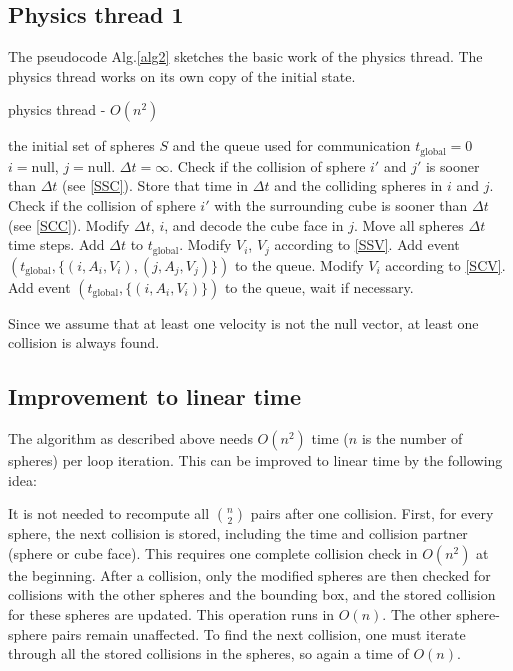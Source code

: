 \documentclass[journal, letterpaper]{IEEEtran}
\begin{document}
\subsection{Physics thread 1}
The pseudocode Alg.\ref{alg2} sketches the basic work of the physics thread. The physics thread works on its own copy of the initial state.
\begin{algorithm}
\caption{physics thread - $O(n^2)$}
\label{alg2}
\begin{algorithmic}
	\REQUIRE the initial set of spheres $S$ and the queue used for communication
	\STATE $t_\text{global}=0$ 
	\LOOP
		\STATE $i=\text{null}$, $j=\text{null}$.
		\STATE $\Delta t = \infty$.
			\STATE Check if the collision of sphere $i'$ and $j'$ is sooner than $\Delta t$ (see \ref{SSC}). Store that time in $\Delta t$ and the colliding spheres in $i$ and $j$.
		\ENDFOR
		\STATE Check if the collision of sphere $i'$ with the surrounding cube is sooner than $\Delta t$ (see \ref{SCC}). Modify $\Delta t$, $i$, and decode the cube face in $j$.
		\ENDFOR
		\STATE Move all spheres $\Delta t$ time steps.
		\STATE Add $\Delta t$ to $t_\text{global}$.
			\STATE Modify $V_i$, $V_j$ according to \ref{SSV}.
			\STATE Add event $(t_\text{global}, \{(i, A_i, V_i), (j, A_j, V_j)\})$ to the queue.
			\STATE Modify $V_i$ according to \ref{SCV}.
			\STATE Add event $(t_\text{global}, \{(i, A_i, V_i)\})$ to the queue, wait if necessary.
		\ENDIF
	\ENDLOOP
\end{algorithmic}
\end{algorithm}
Since we assume that at least one velocity is not the null vector, at least one collision is always found.

\subsection{Improvement to linear time}
The algorithm as described above needs $O(n^2)$ time ($n$ is the number of spheres) per loop iteration.
This can be improved to linear time by the following idea:

It is not needed to recompute all $\binom{n}{2}$ pairs after one collision. First, for every sphere, the next collision is stored, including the time and collision partner (sphere or cube face). This requires one complete collision check in $O(n^2)$ at the beginning. After a collision, only the modified spheres are then checked for collisions with the other spheres and the bounding box, and the stored collision for these spheres are updated. This operation runs in $O(n)$. The other sphere-sphere pairs remain unaffected. To find the next collision, one must iterate through all the stored collisions in the spheres, so again a time of $O(n)$.
\end{document}

